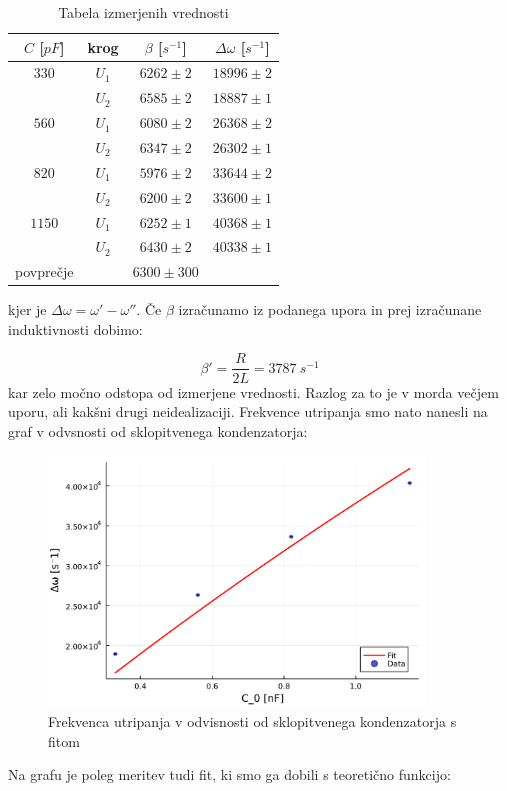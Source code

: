 \documentclass[12pt]{article}
\begin{document}
\begin{table}[!ht]
\centering
\begin{tabular}{c|c|c|c}
    $C$ [$pF$] & krog & $\beta$ [$s^{-1}$] & $\Delta  \omega$ [$s^{-1}$] \\\hline \hline

    $330$ & $U_1$ & $6262 \pm 2$ & $18996 \pm 2$\\
    & $U_2$ & $6585\pm 2$ & $18887 \pm 1$\\
    $560$ & $U_1$ & $6080\pm 2$ & $26368\pm 2$\\
    & $U_2$ & $6347\pm 2$ & $26302\pm 1$\\
    $820$ & $U_1$ & $5976\pm 2$ & $33644\pm 2$\\
    & $U_2$ & $6200\pm 2$ & $33600\pm 1$\\
    $1150$ &$U_1$ & $6252\pm 1$ & $40368\pm 1$\\
    & $U_2$ & $6430\pm 2$ & $40338\pm 1$\\\hline \hline
    povprečje && $6300\pm 300$ &
\end{tabular}
\caption{Tabela izmerjenih vrednosti}
\end{table}
kjer je $\Delta \omega = \omega' - \omega''$. Če $\beta$ izračunamo iz podanega upora in prej izračunane induktivnosti dobimo:

$$
\beta' = \frac{R}{2L} = 3787\ s^{-1}
$$
kar zelo močno odstopa od izmerjene vrednosti. Razlog za to je v morda večjem uporu, ali kakšni drugi neidealizaciji. Frekvence utripanja smo nato nanesli na graf v odvsnosti od sklopitvenega kondenzatorja:

\begin{figure}[ht]
\begin{center}
    \includegraphics[width=10cm]{freq.pdf}
    \caption{Frekvenca utripanja v odvisnosti od sklopitvenega kondenzatorja s fitom}
\end{center}
\end{figure}
Na grafu je poleg meritev tudi fit, ki smo ga dobili s teoretično funkcijo:
\end{document}
